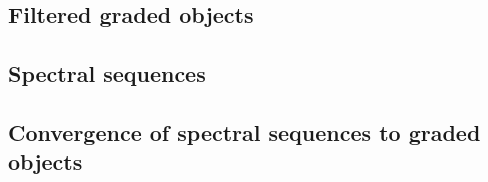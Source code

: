 \subsection{Filtered graded objects}








\subsection{Spectral sequences}









\subsection{Convergence of spectral sequences to graded objects}
















